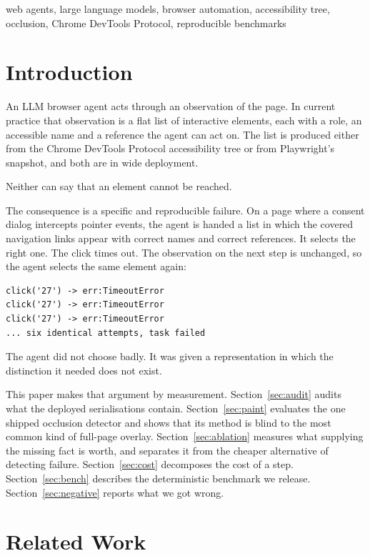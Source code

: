 \documentclass[conference]{IEEEtran}
\begin{document}
\begin{IEEEkeywords}
web agents, large language models, browser automation, accessibility tree,
occlusion, Chrome DevTools Protocol, reproducible benchmarks
\end{IEEEkeywords}

\section{Introduction}

An LLM browser agent acts through an observation of the page. In current
practice that observation is a flat list of interactive elements, each with a
role, an accessible name and a reference the agent can act on. The list is
produced either from the Chrome DevTools Protocol accessibility tree or from
Playwright's snapshot, and both are in wide deployment.

Neither can say that an element cannot be reached.

The consequence is a specific and reproducible failure. On a page where a
consent dialog intercepts pointer events, the agent is handed a list in which
the covered navigation links appear with correct names and correct references.
It selects the right one. The click times out. The observation on the next step
is unchanged, so the agent selects the same element again:

\begin{verbatim}
click('27') -> err:TimeoutError
click('27') -> err:TimeoutError
click('27') -> err:TimeoutError
... six identical attempts, task failed
\end{verbatim}

The agent did not choose badly. It was given a representation in which the
distinction it needed does not exist.

This paper makes that argument by measurement. Section~\ref{sec:audit} audits
what the deployed serialisations contain. Section~\ref{sec:paint} evaluates the
one shipped occlusion detector and shows that its method is blind to the most
common kind of full-page overlay. Section~\ref{sec:ablation} measures what
supplying the missing fact is worth, and separates it from the cheaper
alternative of detecting failure. Section~\ref{sec:cost} decomposes the cost of
a step. Section~\ref{sec:bench} describes the deterministic benchmark we
release. Section~\ref{sec:negative} reports what we got wrong.

\section{Related Work}
\end{document}
